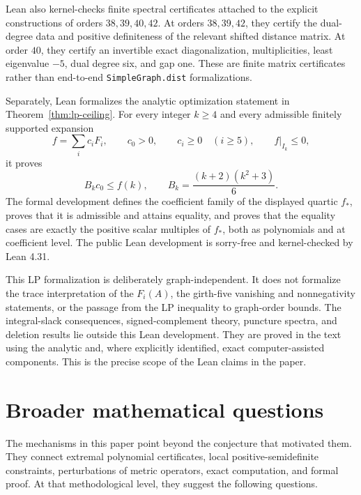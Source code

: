 \documentclass[a4paper,10pt,reqno]{amsart}
\theoremstyle{plain}
\theoremstyle{definition}
\theoremstyle{remark}
\begin{document}
Lean also kernel-checks finite spectral certificates attached to the explicit
constructions of orders \(38,39,40,42\).  At orders \(38,39,42\), they
certify the dual-degree data and positive definiteness of the relevant shifted
distance matrix.  At order \(40\), they certify an invertible exact
diagonalization, multiplicities, least eigenvalue \(-5\), dual degree six,
and gap one.  These are finite matrix certificates rather than end-to-end
\texttt{SimpleGraph.dist} formalizations.

Separately, Lean formalizes the analytic optimization statement in
Theorem~\ref{thm:lp-ceiling}.  For every integer \(k\ge4\) and every admissible
finitely supported expansion
\[
  f=\sum_i c_iF_i,
  \qquad c_0>0,
  \qquad c_i\ge0\quad(i\ge5),
  \qquad f\vert_{I_k}\le0,
\]
it proves
\[
  B_kc_0\le f(k),
  \qquad B_k=\frac{(k+2)(k^2+3)}6.
\]
The formal development defines the coefficient family of the displayed
quartic \(f_*\), proves that it is admissible and attains equality, and proves
that the equality cases are exactly the positive scalar multiples of \(f_*\),
both as polynomials and at coefficient level.  The public Lean development is
sorry-free and kernel-checked by Lean 4.31.

This LP formalization is deliberately graph-independent.  It does not
formalize the trace interpretation of the \(F_i(A)\), the girth-five
vanishing and nonnegativity statements, or the passage from the LP inequality
to graph-order bounds.  The integral-slack consequences, signed-complement
theory, puncture spectra, and deletion results lie outside this Lean
development.  They are proved in the text using the analytic and, where
explicitly identified, exact computer-assisted components.  This is the
precise scope of the Lean claims in the paper.

\section{Broader mathematical questions}\label{sec:scope}

The mechanisms in this paper point beyond the conjecture that motivated them.
They connect extremal polynomial certificates, local positive-semidefinite
constraints, perturbations of metric operators, exact computation, and formal
proof.  At that methodological level, they suggest the following questions.
\end{document}
